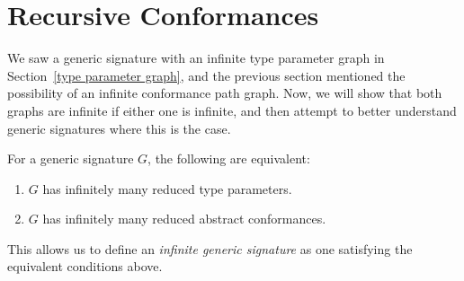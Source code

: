 \documentclass[../generics]{subfiles}
\begin{document}
\section{Recursive Conformances}\label{recursive conformances}

We saw a generic signature with an infinite type parameter graph in Section~\ref{type parameter graph}, and the previous section mentioned the possibility of an infinite conformance path graph. Now, we will show that both graphs are infinite if either one is infinite, and then attempt to better understand generic signatures where this is the case.

\begin{proposition}\label{infinite signature lemma} For a generic signature $G$, the following are equivalent:
\begin{enumerate}
\item $G$ has infinitely many reduced type parameters.
\item $G$ has infinitely many reduced abstract conformances.
\end{enumerate}
This allows us to define an \emph{infinite generic signature} as one satisfying the equivalent conditions above.
\end{proposition}
\end{document}
